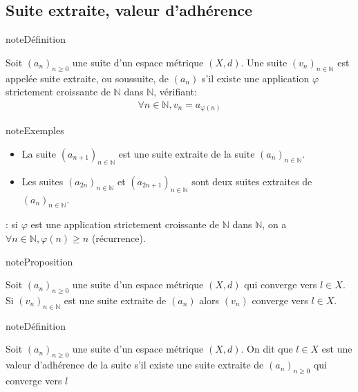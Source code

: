 \documentclass[letterpaper,10pt,french]{sphinxmanual}
\begin{document}
\subsection{Suite extraite, valeur d’adhérence}
\label{\detokenize{convergence:suite-extraite-valeur-d-adherence}}
\begin{sphinxadmonition}{note}{Définition}

\sphinxAtStartPar
Soit \((a_n)_{n\geq 0}\) une suite d’un espace métrique \((X, d)\). Une suite \((v_n)_{n\in \mathbb N}\) est appelée suite extraite, ou sous\sphinxhyphen{}suite, de  \((a_n)\) s’il existe une application \(\varphi\) strictement croissante de \(\mathbb N\) dans \(\mathbb N\), vérifiant:
\begin{equation*}
\begin{split}
\forall n \in \mathbb N, v_n = a_{\varphi(n)}
\end{split}
\end{equation*}\end{sphinxadmonition}

\begin{sphinxadmonition}{note}{Exemples}
\begin{itemize}
\item {} 
\sphinxAtStartPar
La suite \((a_{n+1})_{n\in \mathbb N}\) est une suite extraite de la suite \((a_{n})_{n\in \mathbb N}\).

\item {} 
\sphinxAtStartPar
Les suites \((a_{2n})_{n\in \mathbb N}\) et \((a_{2n+1})_{n\in \mathbb N}\) sont deux suites extraites de \((a_{n})_{n\in \mathbb N}\).

\end{itemize}
\end{sphinxadmonition}

\sphinxAtStartPar
{}: si \(\varphi\) est une application strictement croissante de \(\mathbb N\) dans \(\mathbb N\), on a \(\forall n \in \mathbb N, \varphi(n)\geq n\) (récurrence).

\begin{sphinxadmonition}{note}{Proposition}

\sphinxAtStartPar
Soit \((a_n)_{n\geq 0}\) une suite d’un espace métrique \((X, d)\) qui converge vers \(l \in X\). Si \((v_n)_{n\in \mathbb N}\) est une suite extraite de  \((a_n)\) alors \((v_n)\) converge vers \(l\in X\).
\end{sphinxadmonition}

\begin{sphinxadmonition}{note}{Définition}

\sphinxAtStartPar
Soit \((a_n)_{n\geq 0}\) une suite d’un espace métrique \((X, d)\). On dit que \(l\in X\) est une valeur d’adhérence de la suite s’il existe une suite extraite de \((a_n)_{n\geq 0}\) qui converge vers \(l\)
\end{sphinxadmonition}
\end{document}
